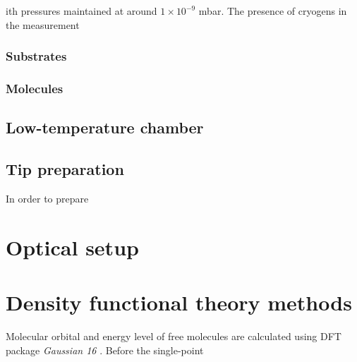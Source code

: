 ith pressures maintained at around $1 \times 10^{-9}$ mbar. The presence of cryogens in the measurement 

\subsubsection{Substrates}

\subsubsection{Molecules}



\subsection{Low-temperature chamber}



\subsection{Tip preparation}
In order to prepare 



\section{Optical setup}






\section{Density functional theory methods}

Molecular orbital and energy level of free molecules are calculated using \ac{DFT} package \emph{Gaussian 16} \citep{frisch2016gaussian}. Before the single-point


